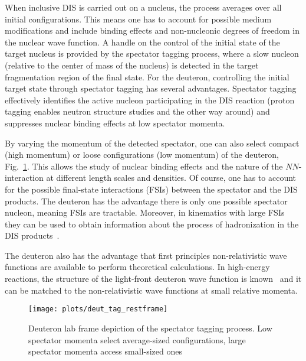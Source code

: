 When inclusive DIS is carried out on a nucleus, the process averages over all initial configurations.  This means one has to account for possible medium modifications and include binding effects and non-nucleonic degrees of freedom in the nuclear wave function.  A handle on the control of the initial state of the target nucleus is provided by the spectator tagging process, where a slow nucleon (relative to the center of mass of the nucleus) is detected in the target fragmentation region of the final state.  For the deuteron, controlling the initial target state through spectator tagging has several advantages.  Spectator tagging effectively identifies the active nucleon participating in the DIS reaction (proton tagging enables neutron structure studies and the other way around) and suppresses nuclear binding effects at low spectator momenta. 

By varying the momentum of the detected spectator, one can also select compact (high momentum) or loose configurations (low momentum) of the deuteron, Fig.~\ref{fig:size}.  This allows the study of nuclear binding effects and the nature of the $NN$-interaction at different length scales and densities.  Of course, one has to account for the possible final-state interactions (FSIs) between the spectator and the DIS products.  The deuteron has the advantage there is only one possible spectator nucleon, meaning FSIs are tractable.  Moreover, in kinematics with large FSIs they can be used to obtain information about the process of hadronization in the DIS products~\cite{Cosyn:2017ekf}.  

The deuteron also has the advantage that first principles non-relativistic wave functions are available to perform theoretical calculations.  In high-energy reactions, the structure of the light-front deuteron wave function is known~\cite{Frankfurt:1981mk,Keister:1991sb} and it can be matched to the non-relativistic wave functions at small relative momenta.

    \begin{figure}[tbp]
        \centering\texttt{[image: plots/deut\_tag\_restframe]}
        \caption{Deuteron lab frame depiction of the spectator tagging process.  Low spectator momenta select average-sized configurations, large spectator momenta access small-sized ones~\cite{deutLDRD}}
        \label{fig:size}
    \end{figure}

